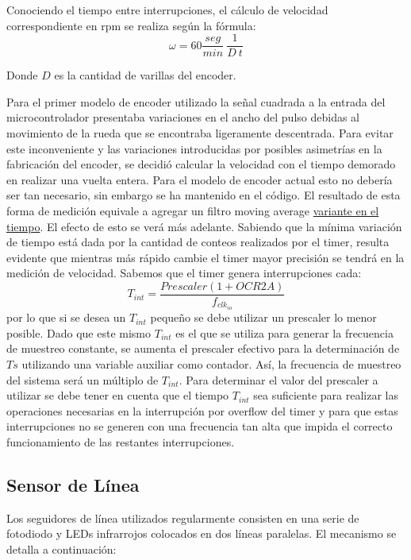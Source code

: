 \documentclass[10pt,conference,a4paper,onecolumn]{article}%
\begin{document}
Conociendo el tiempo entre interrupciones, el cálculo de velocidad correspondiente en rpm se realiza según la fórmula:
\begin{equation*}
\omega=60 \frac{seg}{min}\ \frac{1}{D\ t}
\end{equation*}

Donde $D$ es la cantidad de varillas del encoder. 

Para el primer modelo de encoder utilizado la señal cuadrada a la entrada del microcontrolador presentaba variaciones en el ancho del pulso debidas al movimiento de la rueda que se encontraba ligeramente descentrada. Para evitar este inconveniente y las variaciones introducidas por posibles asimetrías en la fabricación del encoder,
se decidió calcular la velocidad con el tiempo demorado en realizar una vuelta entera. Para el modelo de encoder actual esto no debería ser tan necesario, sin embargo se ha mantenido en el código. El resultado de esta forma de medición equivale a agregar un filtro moving average {\color{red}\underline{ variante en el tiempo}}. El efecto de esto se verá más
adelante.
Sabiendo que la mínima variación de tiempo está dada por la cantidad de conteos realizados por el timer, resulta evidente que mientras más rápido cambie el timer mayor precisión se tendrá en la medición de velocidad.
Sabemos que el timer genera interrupciones cada:
\begin{equation}
T_{int}=\frac{Prescaler(1+OCR2A)}{f_{clk_{io}}}
\end{equation}
por lo que si se desea un $T_{int}$ pequeño se debe utilizar un prescaler lo menor posible. Dado que este mismo $T_{int}$ es el que se utiliza para generar la frecuencia de muestreo constante, se aumenta el prescaler efectivo para la determinación de $Ts$ utilizando una variable auxiliar como contador. Así, la frecuencia de muestreo del sistema será un múltiplo de $T_{int}$. Para determinar el valor del prescaler a utilizar se debe tener en cuenta que el tiempo $T_{int}$ sea suficiente para realizar las operaciones necesarias en la interrupción por overflow del timer y para que estas interrupciones no se generen con una frecuencia tan alta que impida el correcto funcionamiento de las restantes interrupciones.

\subsection{Sensor de Línea}
Los seguidores de línea utilizados regularmente consisten en una serie de fotodiodo y LEDs infrarrojos colocados en dos líneas paralelas. El mecanismo se detalla a continuación:
\end{document}
